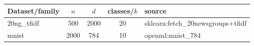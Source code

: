 \begin{tabular}{lcccl}
\toprule
Dataset/family & $n$ & $d$ & classes/$k$ & source \\
\midrule
20ng\_tfidf & 500 & 2000 & 20 & sklearn:fetch\_20newsgroups+tfidf \\
mnist & 2000 & 784 & 10 & openml:mnist\_784 \\
\bottomrule
\end{tabular}
